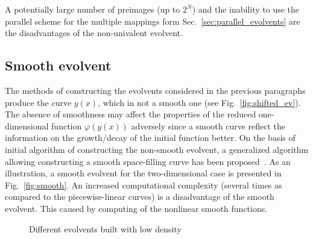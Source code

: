 \documentclass[runningheads]{llncs}
\begin{document}
A potentially large number of preimages (up to $2^N$) and the inability to use the parallel
scheme for the multiple mappings form Sec.~\ref{sec:parallel_evolvents} are the disadvantages
of the non-univalent evolvent.


\subsection{Smooth evolvent}

The methods of constructing the evolvents considered in the previous paragraphs produce the
curve $y(x)$, which in not a smooth one (see Fig.~\ref{fig:shifted_ev}). The absence of
smoothness may affect the properties of the reduced one-dimensional function $\varphi(y(x))$
adversely since a smooth curve reflect the information on the growth/decay of the initial
function better. On the basis of initial algorithm of constructing the non-smooth evolvent, a
generalized algorithm allowing constructing a smooth space-filling curve has been
proposed~\cite{Goryachih2017}. As an illustration, a smooth evolvent for the two-dimensional
case is presented in Fig.~\ref{fig:smooth}.
An increased computational complexity (several times as compared to the piecewise-linear
curves) is a disadvantage of the smooth evolvent. This caused by computing of the nonlinear smooth
functions.


\begin{figure}[ht]
    \centering
    \caption{Different evolvents built with low density}
\end{figure}
\end{document}
